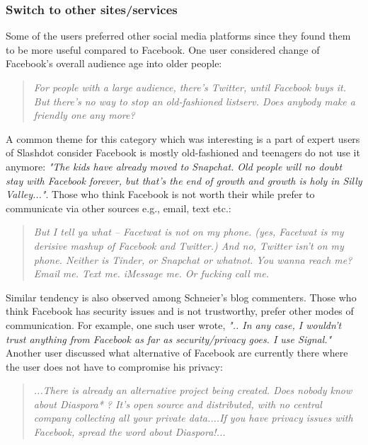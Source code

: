  \subsubsection{Switch to other sites/services}
 Some of the users preferred other social media platforms since they found them to be more useful compared to Facebook. One user considered change of Facebook's overall audience age into older people: 
     \begin{quote}
         \textit{For people with a large audience, there's Twitter, until Facebook buys it. But there's no way to stop an old-fashioned listserv. Does anybody make a friendly one any more? }
     \end{quote}
    A common theme for this category which was interesting is a part of expert users of Slashdot consider Facebook is mostly old-fashioned and teenagers do not use it anymore: \textit{"The kids have already moved to Snapchat. Old people will no doubt stay with Facebook forever, but that's the end of growth and growth is holy in Silly Valley..."}. Those who think Facebook is not worth their while prefer to communicate via other sources e.g., email, text etc.:
    \begin{quote}
         \textit{ But I tell ya what -- Facetwat is not on my phone. (yes, Facetwat is my derisive mashup of Facebook and Twitter.) And no, Twitter isn't on my phone. Neither is Tinder, or Snapchat or whatnot. You wanna reach me? Email me. Text me. iMessage me. Or fucking call me.}
    \end{quote}
    
    Similar tendency is also observed among Schneier's blog commenters. Those who think Facebook has security issues and is not trustworthy, prefer other modes of communication. For example, one such user wrote, \textit{".. In any case, I wouldn't trust anything from Facebook as far as security/privacy goes. I use Signal."} Another user discussed what alternative of Facebook are currently there where the user does not have to compromise his privacy:
    \begin{quote}
         \textit{...There is already an alternative project being created. Does nobody know about Diaspora* ? It's open source and distributed, with no central company collecting all your private data....If you have privacy issues with Facebook, spread the word about Diaspora!... }
    \end{quote}
    

 
     
